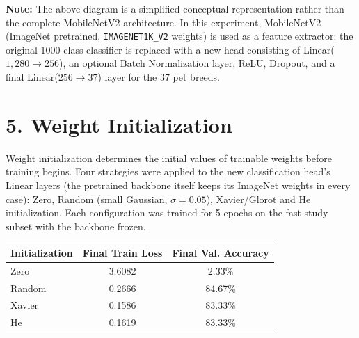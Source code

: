 \documentclass[10pt]{article}
\begin{document}
\begin{center}
\end{center}

\textbf{Note:} The above diagram is a simplified conceptual representation
rather than the complete MobileNetV2 architecture. In this experiment,
MobileNetV2 (ImageNet pretrained, \texttt{IMAGENET1K\_V2} weights) is used
as a feature extractor: the original 1000-class classifier is replaced with
a new head consisting of Linear($1{,}280 \rightarrow 256$), an optional
Batch Normalization layer, ReLU, Dropout, and a final Linear($256
\rightarrow 37$) layer for the 37 pet breeds.

\section*{5. Weight Initialization}

Weight initialization determines the initial values of trainable weights
before training begins. Four strategies were applied to the new
classification head's Linear layers (the pretrained backbone itself keeps
its ImageNet weights in every case): Zero, Random (small Gaussian, $\sigma
= 0.05$), Xavier/Glorot and He initialization. Each configuration was
trained for 5 epochs on the fast-study subset with the backbone frozen.

\begin{center}
\begin{tabular}{|l|c|c|}
\hline
\textbf{Initialization} & \textbf{Final Train Loss} & \textbf{Final Val. Accuracy}\\
\hline
Zero    & 3.6082 & 2.33\%\\
Random  & 0.2666 & 84.67\%\\
Xavier  & 0.1586 & 83.33\%\\
He      & 0.1619 & 83.33\%\\
\hline
\end{tabular}
\end{center}
\end{document}
